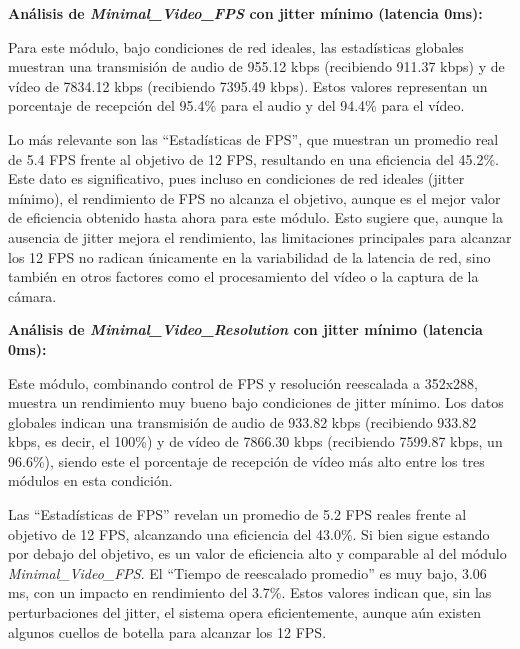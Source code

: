 \vspace{\baselineskip}

\textbf{Análisis de \textit{Minimal\_Video\_FPS} con jitter mínimo (latencia 0ms):}
\vspace{\baselineskip}

Para este módulo, bajo condiciones de red ideales, las estadísticas globales muestran una transmisión de audio de 955.12 kbps (recibiendo 911.37 kbps) y de vídeo de 7834.12 kbps (recibiendo 7395.49 kbps). Estos valores representan un porcentaje de recepción del 95.4\% para el audio y del 94.4\% para el vídeo.


Lo más relevante son las ``Estadísticas de FPS'', que muestran un promedio real de 5.4 FPS frente al objetivo de 12 FPS, resultando en una eficiencia del 45.2\%. Este dato es significativo, pues incluso en condiciones de red ideales (jitter mínimo), el rendimiento de FPS no alcanza el objetivo, aunque es el mejor valor de eficiencia obtenido hasta ahora para este módulo. Esto sugiere que, aunque la ausencia de jitter mejora el rendimiento, las limitaciones principales para alcanzar los 12 FPS no radican únicamente en la variabilidad de la latencia de red, sino también en otros factores como el procesamiento del vídeo o la captura de la cámara.
\vspace{\baselineskip}

\textbf{Análisis de \textit{Minimal\_Video\_Resolution} con jitter mínimo (latencia 0ms):}
\vspace{\baselineskip}

Este módulo, combinando control de FPS y resolución reescalada a 352x288, muestra un rendimiento muy bueno bajo condiciones de jitter mínimo. Los datos globales indican una transmisión de audio de 933.82 kbps (recibiendo 933.82 kbps, es decir, el 100\%) y de vídeo de 7866.30 kbps (recibiendo 7599.87 kbps, un 96.6\%), siendo este el porcentaje de recepción de vídeo más alto entre los tres módulos en esta condición.
\vspace{\baselineskip}

Las ``Estadísticas de FPS'' revelan un promedio de 5.2 FPS reales frente al objetivo de 12 FPS, alcanzando una eficiencia del 43.0\%. Si bien sigue estando por debajo del objetivo, es un valor de eficiencia alto y comparable al del módulo \textit{Minimal\_Video\_FPS}. El ``Tiempo de reescalado promedio'' es muy bajo, 3.06 ms, con un impacto en rendimiento del 3.7\%. Estos valores indican que, sin las perturbaciones del jitter, el sistema opera eficientemente, aunque aún existen algunos cuellos de botella para alcanzar los 12 FPS.
\vspace{\baselineskip}

